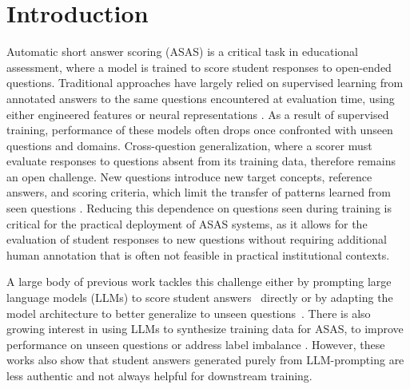 \section{Introduction}

Automatic short answer scoring (ASAS) is a critical task in educational assessment, where a model is trained to score student responses to open-ended questions.
Traditional approaches have largely relied on supervised learning from annotated answers to the same questions encountered at evaluation time, using either engineered features or neural representations \citep{burrowsErasTrendsAutomatic2015,riordanInvestigatingNeuralArchitectures2017}. As a result of supervised training, performance of these models often drops once confronted with unseen questions and domains.
Cross-question generalization, where a scorer must evaluate responses to questions absent from its training data, therefore remains an open challenge.
New questions introduce new target concepts, reference answers, and scoring criteria, which limit the transfer of patterns learned from seen questions \citep{dzikovskaSemEval2013Task2013,funayamaReducingCostCrossPrompt2023}.
Reducing this dependence on questions seen during training is critical for the practical deployment of ASAS systems, as it allows for the evaluation of student responses to new questions without requiring additional human annotation that is often not feasible in practical institutional contexts.

A large body of previous work tackles this challenge either by prompting large language models (LLMs) to score student answers~\citep{changAutomaticShortAnswer2024,chamiehLLMsShortAnswer2024} directly or by adapting the model architecture to better generalize to unseen questions~\citep{wangInjectRubricsShort2019,liSemanticFeatureWiseTransformation2021,funayamaReducingCostCrossPrompt2023,wuMatchingExemplarNext2023,sun-etal-2026-rubric}. There is also growing interest in using LLMs to synthesize training data for ASAS, to improve performance on unseen questions or address label imbalance \citep{yeZeroGenEfficientZeroshot2022,bexteLunchFreeOvercoming2025}. However, these works also show that student answers generated purely from LLM-prompting are less authentic and not always helpful for downstream training. 

